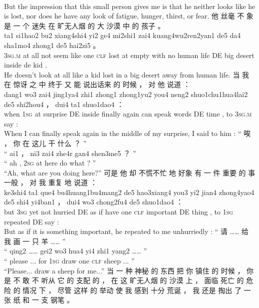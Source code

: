 \documentclass[UTF8]{ctexart}
\begin{document}
\begin{exe}
\\
\trans But the impression that this small person gives me is that he neither looks like he is lost, nor does he have any look of fatigue, hunger, thirst, or fear. 
\ex
\glll
他 丝毫 不 象是 一 个 迷失 在 旷无人烟 的 大 沙漠 中 的 孩子 。
\\
ta1 si1hao2 bu2 xiang4shi4 yi2 ge4 mi2shi1 zai4 kuang4wu2ren2yan1 de5 da4 sha1mo4 zhong1 de5 hai2zi5 。
\\
\textsc{3sg.m} {at all} not {seem like} one \textsc{clf} lost at {empty with no human life} DE big desert inside de kid .
\\
\trans He doesn't look at all like a kid lost in a big desert away from human life. 
\ex
\glll
当 我 在 惊讶 之 中 终于 又 能 说出话来 的 时候 ， 对 他 说道 ：
\\
dang1 wo3 zai4 jing1ya4 zhi1 zhong1 zhong1yu2 you4 neng2 shuo1chu1hua4lai2 de5 shi2hou4 ， dui4 ta1 shuo1dao4 ：
\\
when \textsc{1sg} at surprise DE inside finally again can {speak words} DE time , to \textsc{3sg.m} say :
\\
\trans When I can finally speak again in the middle of my surprise, I said to him :
\ex
\glll
“ 唉 ， 你 在 这儿 干 什么 ？ ”
\\
“ ai1 ， ni3 zai4 zhe4r gan4 shen3me5 ？ ”
\\
`` ah , \textsc{2sg} at here do what ? ''
\\
\trans ``Ah, what are you doing here?''
\ex
\glll
可是 他 却 不慌不忙 地 好象 有 一 件 重要 的 事 一般 ， 对 我 重复 地 说道 ：
\\
ke3shi4 ta1 que4 bu4huang1bu4mang2 de5 hao3xiang4 you3 yi2 jian4 zhong4yao4 de5 shi4 yi4ban1 ， dui4 wo3 chong2fu4 de5 shuo1dao4 ：
\\
but \textsc{3sg} yet {not hurried} DE {as if} have one \textsc{clf} important DE thing {} , to \textsc{1sg} repeated DE say :
\\
\trans But as if it is something important, he repeated to me unhurriedly :
\ex
\glll
“ 请 …… 给 我 画 一 只 羊 …… ”
\\
“ qing2 …… gei2 wo3 hua4 yi4 zhi1 yang2 …… ”
\\
`` please ... for \textsc{1sg} draw one \textsc{clf} sheep ... ''
\\
\trans ``Please... draw a sheep for me...''
\ex
\glll
当 一 种 神秘 的 东西 把 你 镇住 的 时候 ， 你 是 不 敢 不 听从 它 的 支配 的 ， 在 这 旷无人烟 的 沙漠 上 ， 面临 死亡 的 危险 的 情况 下 ， 尽管 这样 的 举动 使 我 感到 十分 荒诞 ， 我 还是 掏出 了 一 张 纸 和 一 支 钢笔 。

\end{exe}
\end{document}
